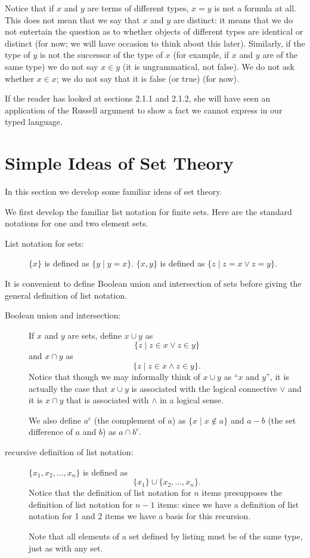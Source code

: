 \documentclass[12pt]{book}
\begin{document}
Notice that if $x$ and $y$ are terms of different types, $x=y$ is not
a formula at all.  This does not mean that we say that $x$ and $y$
are distinct: it means that we do not entertain the question as to
whether objects of different types are identical or distinct (for now;
we will have occasion to think about this later).  Similarly, if the
type of $y$ is not the successor of the type of $x$ (for example, if
$x$ and $y$ are of the same type) we do not say $x \in y$ (it is
ungrammatical, not false).  We do not ask whether $x \in x$; we do not
say that it is false (or true) (for now).

If the reader has looked at sections 2.1.1 and 2.1.2, she will have seen an application of the Russell argument to show a fact we cannot express in our typed language.

\newpage

\section{Simple Ideas of Set Theory}

In this section we develop some familiar ideas of set theory.

We first develop the familiar list notation for finite sets.  Here are
the standard notations for one and two element sets.

\begin{description}

\item[List notation for sets:]  $\{x\}$ is defined as $\{y \mid y=x\}$.
$\{x,y\}$ is defined as $\{z \mid z=x\vee z=y\}$.

\end{description}

It is convenient to define Boolean union and intersection of sets
before giving the general definition of list notation.

\begin{description}

\item[Boolean union and intersection:] If $x$ and $y$ are sets, define
$x \cup y$ as $$\{z \mid z \in x \vee z \in y\}$$ and $x \cap y$ as $$\{z
\mid z \in x \wedge z \in y\}.$$  Notice that though we may informally
think of $x \cup y$ as ``$x$ and $y$'', it is actually the case that
$x \cup y$ is associated with the logical connective $\vee$ and it is
$x \cap y$ that is associated with $\wedge$ in a logical sense.

We also define $a^c$ (the complement of $a$) as $\{x \mid x \not\in
a\}$ and $a-b$ (the set difference of $a$ and $b$) as $a \cap b^c$.

\item[recursive definition of list notation:] $\{x_1,x_2,\ldots,x_n\}$
is defined as $$\{x_1\} \cup \{x_2,\ldots,x_n\}.$$  Notice that the
definition of list notation for $n$ items presupposes the definition
of list notation for $n-1$ items: since we have a definition of list
notation for 1 and 2 items we have a basis for this recursion.

Note that all elements of a set defined by listing must be of the same
type, just as with any set.

\end{description}
\end{document}
